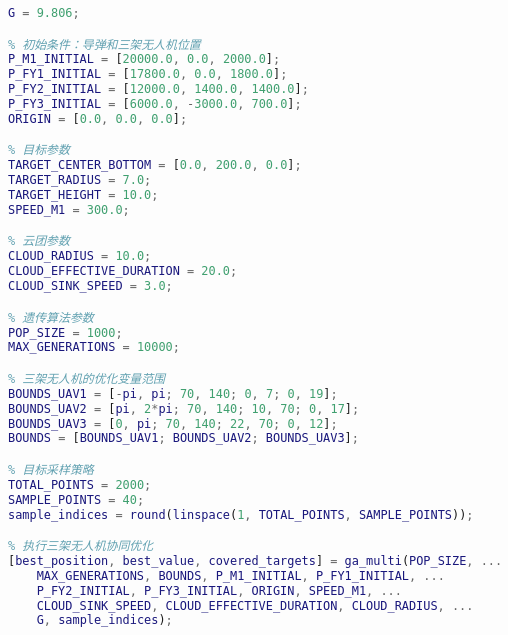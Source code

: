 \begin{lstlisting}[language=Matlab,caption={第四问核心优化代码}]
% 物理常量
G = 9.806;

% 初始条件：导弹和三架无人机位置
P_M1_INITIAL = [20000.0, 0.0, 2000.0];
P_FY1_INITIAL = [17800.0, 0.0, 1800.0];
P_FY2_INITIAL = [12000.0, 1400.0, 1400.0];
P_FY3_INITIAL = [6000.0, -3000.0, 700.0];
ORIGIN = [0.0, 0.0, 0.0];

% 目标参数
TARGET_CENTER_BOTTOM = [0.0, 200.0, 0.0];
TARGET_RADIUS = 7.0;
TARGET_HEIGHT = 10.0;
SPEED_M1 = 300.0;

% 云团参数
CLOUD_RADIUS = 10.0;
CLOUD_EFFECTIVE_DURATION = 20.0;
CLOUD_SINK_SPEED = 3.0;

% 遗传算法参数
POP_SIZE = 1000;
MAX_GENERATIONS = 10000;

% 三架无人机的优化变量范围
BOUNDS_UAV1 = [-pi, pi; 70, 140; 0, 7; 0, 19];
BOUNDS_UAV2 = [pi, 2*pi; 70, 140; 10, 70; 0, 17];
BOUNDS_UAV3 = [0, pi; 70, 140; 22, 70; 0, 12];
BOUNDS = [BOUNDS_UAV1; BOUNDS_UAV2; BOUNDS_UAV3];

% 目标采样策略
TOTAL_POINTS = 2000;
SAMPLE_POINTS = 40;
sample_indices = round(linspace(1, TOTAL_POINTS, SAMPLE_POINTS));

% 执行三架无人机协同优化
[best_position, best_value, covered_targets] = ga_multi(POP_SIZE, ...
    MAX_GENERATIONS, BOUNDS, P_M1_INITIAL, P_FY1_INITIAL, ...
    P_FY2_INITIAL, P_FY3_INITIAL, ORIGIN, SPEED_M1, ...
    CLOUD_SINK_SPEED, CLOUD_EFFECTIVE_DURATION, CLOUD_RADIUS, ...
    G, sample_indices);
\end{lstlisting}